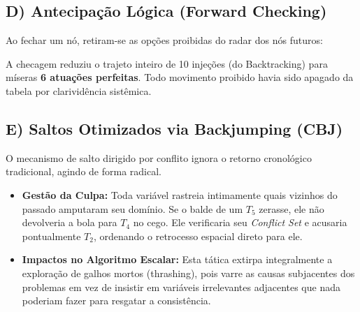 \subsection*{D) Antecipação Lógica (Forward Checking)}

Ao fechar um nó, retiram-se as opções proibidas do radar dos nós futuros:

\begin{table}[H]
\centering
{}
\end{table}

A checagem reduziu o trajeto inteiro de 10 injeções (do Backtracking) para míseras \textbf{6 atuações perfeitas}. Todo movimento proibido havia sido apagado da tabela por clarividência sistêmica.

\subsection*{E) Saltos Otimizados via Backjumping (CBJ)}

O mecanismo de salto dirigido por conflito ignora o retorno cronológico tradicional, agindo de forma radical.

\begin{itemize}
    \item \textbf{Gestão da Culpa:} Toda variável rastreia intimamente quais vizinhos do passado amputaram seu domínio. Se o balde de um $T_5$ zerasse, ele não devolveria a bola para $T_4$ no cego. Ele verificaria seu \textit{Conflict Set} e acusaria pontualmente $T_2$, ordenando o retrocesso espacial direto para ele.
    \item \textbf{Impactos no Algoritmo Escalar:} Esta tática extirpa integralmente a exploração de galhos mortos (thrashing), pois varre as causas subjacentes dos problemas em vez de insistir em variáveis irrelevantes adjacentes que nada poderiam fazer para resgatar a consistência.
\end{itemize}
